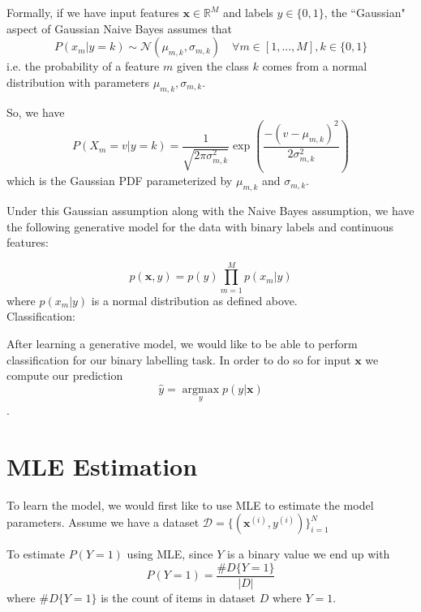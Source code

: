 \documentclass[11pt,addpoints,answers]{exam}
\newcommand \argmax {\operatorname*{argmax}}
\begin{document}
Formally, if we have input features $\mathbf{x} \in \mathbb{R}^M$ and labels $y \in \{0,1\}$, the ``Gaussian" aspect of Gaussian Naive Bayes assumes that $$P(x_m |y=k) \sim \mathcal{N}(\mu_{m,k}, \sigma_{m,k}) \quad \forall m \in [1,...,M], k \in \{0,1\}$$ i.e. the probability of a feature $m$ given the class $k$ comes from a normal distribution with parameters $\mu_{m,k}, \sigma_{m,k}$.

So, we have $$P(X_m = v | y = k) = \frac{1}{\sqrt{2\pi\sigma_{m,k}^2}} \exp{(\frac{-(v-\mu_{m,k})^2}{2\sigma_{m,k}^2})}$$ which is the Gaussian PDF parameterized by $\mu_{m,k}$ and $\sigma_{m,k}$.

Under this Gaussian assumption along with the Naive Bayes assumption, we have the following generative model for the data with binary labels and continuous features: 

$$p(\mathbf{x},y) = p(y)\prod_{m=1}^{M} p(x_m|y)$$ where $p(x_m|y)$ is a normal distribution as defined above. \\

Classification:

After learning a generative model, we would like to be able to perform classification for our binary labelling task. In order to do so for input $\mathbf{x}$ we compute our prediction $$\hat{y} = \argmax_y p(y|\mathbf{x})$$. \\





\section{MLE Estimation}

To learn the model, we would first like to use MLE to estimate the model parameters. Assume we have a dataset $\mathcal{D} = \{(\mathbf{x}^{(i)},y^{(i)})\}_{i=1}^N$

To estimate $P(Y=1)$ using MLE, since $Y$ is a binary value we end up with $$P(Y=1) = \frac{\#D\{Y=1\}}{|D|}$$ where $\#D\{Y=1\}$ is the count of items in dataset $D$ where $Y = 1$. 
\end{document}
